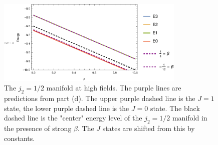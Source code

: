 \documentclass{article}
\theoremstyle{definition}
\newcommand{\be}{\beta}
\begin{document}
\begin{enumerate}[label=(\alph*)]
	
	\begin{figure}[!htb]
		\centering
		\includegraphics[width=0.8\textwidth]{B_high_zoom_2.eps}
		\caption{The $j_2=1/2$ manifold at high fields. The purple lines are predictions from part (d). The upper purple dashed line is the $J=1$ state, the lower purple dashed line is the $J=0$ state. The black dashed line is the "center" energy level of the $j_2=1/2$ manifold in the presence of strong $\be$. The $J$ states are shifted from this by constants.} 
		\label{fig:4}
	\end{figure}
	
\end{enumerate}
\end{document}
